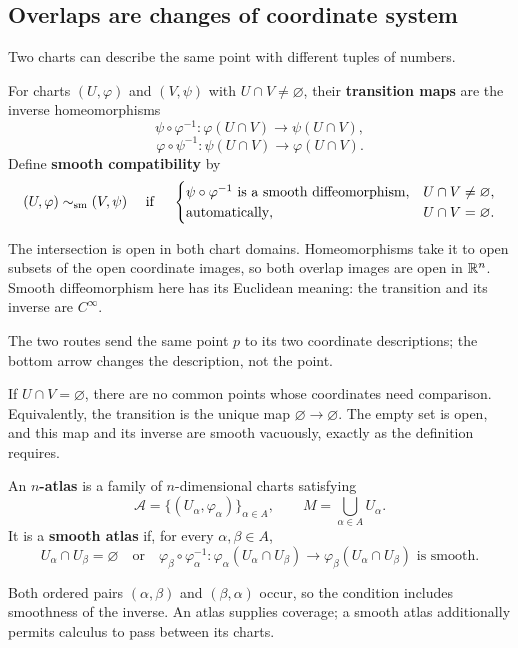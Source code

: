 \subsection{Overlaps are changes of coordinate system}
Two charts can describe the same point with different tuples of numbers.
\begin{definition}
For charts $(U,\varphi)$ and $(V,\psi)$ with $U\cap V\ne\varnothing$,
their \textbf{transition maps} are the inverse homeomorphisms
\[
\boxed{\psi\circ\varphi^{-1}:\varphi(U\cap V)\longrightarrow\psi(U\cap V)},
\]
\[
\boxed{\varphi\circ\psi^{-1}:\psi(U\cap V)\longrightarrow\varphi(U\cap V)}.
\]
Define \textbf{smooth compatibility} by
\[
(U,\varphi)\sim_{\rm sm}(V,\psi)\quad\text{ if }\quad
\begin{cases}
\psi\circ\varphi^{-1}\text{ is a smooth diffeomorphism},&U\cap V\ne\varnothing,\\
\text{automatically},&U\cap V=\varnothing.
\end{cases}
\]
\end{definition}
The intersection is open in both chart domains. Homeomorphisms take it
to open subsets of the open coordinate images, so both overlap images
are open in $\mathbb{R}^n$. Smooth diffeomorphism here has its Euclidean meaning:
the transition and its inverse are $C^\infty$.

\begin{center}
\end{center}
The two routes send the same point $p$ to its two coordinate descriptions;
the bottom arrow changes the description, not the point.

\begin{remark}
If $U\cap V=\varnothing$, there are no common points whose coordinates
need comparison. Equivalently, the transition is the unique map
$\varnothing\to\varnothing$. The empty set is open, and this map and
its inverse are smooth vacuously, exactly as the definition requires.
\end{remark}

\begin{definition}
An \textbf{$n$-atlas} is a family of $n$-dimensional charts satisfying
\[
\mathcal A=\{(U_\alpha,\varphi_\alpha)\}_{\alpha\in A},\qquad
M=\bigcup_{\alpha\in A}U_\alpha.
\]
It is a \textbf{smooth atlas} if, for every $\alpha,\beta\in A$,
\[
U_\alpha\cap U_\beta=\varnothing\quad\text{or}\quad
\varphi_\beta\circ\varphi_\alpha^{-1}:
\varphi_\alpha(U_\alpha\cap U_\beta)\to\varphi_\beta(U_\alpha\cap U_\beta)
\text{ is smooth}.
\]
\end{definition}
Both ordered pairs $(\alpha,\beta)$ and $(\beta,\alpha)$ occur, so the
condition includes smoothness of the inverse. An atlas supplies coverage;
a smooth atlas additionally permits calculus to pass between its charts.

